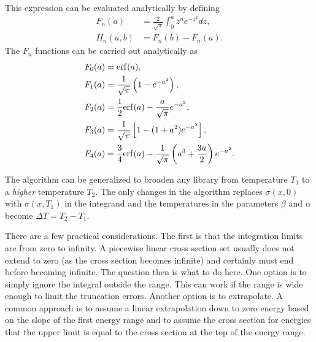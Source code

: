 This expression can be evaluated analytically by defining
\begin{subequations}
\begin{align}
  F_n(a)   &= \frac{2}{\sqrt{\pi}} \int_0^a z^n e^{-z^2} dz , \\
  H_n(a,b) &= F_n(b) - F_n(a) .
\end{align}
\end{subequations}
The $F_n$ functions can be carried out analytically as
\begin{subequations}
\begin{align}
  F_0(a) &= \mathrm{erf}(a) , \\
  F_1(a) &= \frac{1}{\sqrt{\pi}} \left( 1 - e^{-a^2} \right), \\
  F_2(a) &= \frac{1}{2} \mathrm{erf}(a) - \frac{a}{\sqrt{\pi}} e^{-a^2} , \\
  F_3(a) &= \frac{1}{\sqrt{\pi}} \left[ 1 - ( 1 + a^2 ) e^{-a^2} \right] , \\
  F_4(a) &= \frac{3}{4} \mathrm{erf}(a) - \frac{1}{\sqrt{\pi}} \left( a^3 + \frac{3a}{2} \right) e^{-a^2} .
\end{align}
\end{subequations}


The algorithm can be generalized to broaden any library from temperature $T_1$ to a \emph{higher} temperature $T_2$. The only changes in the algorithm replaces $\sigma(x,0)$ with $\sigma(x,T_1)$ in the integrand and the temperatures in the parameters $\beta$ and $\alpha$ become $\Delta T = T_2 - T_1$.

There are a few practical considerations. The first is that the integration limits are from zero to infinity. A piecewise linear cross section set usually does not extend to zero (as the cross section becomes infinite) and certainly must end before becoming infinite. The question then is what to do here. One option is to simply ignore the integral outside the range. This can work if the range is wide enough to limit the truncation errors. Another option is to extrapolate. A common approach is to assume a linear extrapolation down to zero energy based on the slope of the first energy range and to assume the cross section for energies that the upper limit is equal to the cross section at the top of the energy range.

